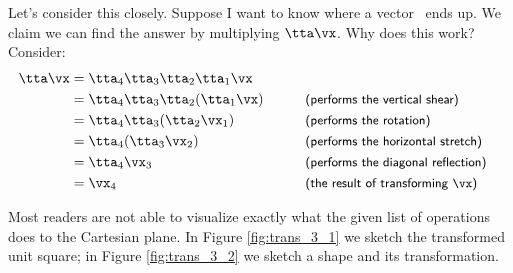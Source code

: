 {Let's consider this closely. Suppose I want to know where a vector \vx\ ends up. We claim we can find the answer by multiplying $\tta\vx$. Why does this work? Consider:
\enlargethispage{2\baselineskip}
\begin{align*}
\tta\vx &= \tta_4\tta_3\tta_2\tta_1\vx \\
				&= \tta_4\tta_3\tta_2(\tta_1\vx) & &\textsf{\hskip 20pt  \small(performs the vertical shear)}\hfill \\
				&= \tta_4\tta_3(\tta_2\vx_1) & &\textsf{\hskip 20pt  \small(performs the rotation)}\hfill\\
				&= \tta_4(\tta_3\vx_2) & &\textsf{\hskip 20pt  \small(performs the horizontal stretch)}\hfill\\
				&= \tta_4\vx_3 & &\textsf{\hskip 20pt  \small(performs the diagonal reflection)}\hfill\\
				&= \vx_4 & &\textsf{\hskip 20pt  \small(the result of transforming $\vx$)}\hfill \\
\end{align*}

Most readers are not able to visualize exactly what the given list of operations does to the Cartesian plane. In Figure \ref{fig:trans_3_1} we sketch the transformed unit square; in Figure \ref{fig:trans_3_2} we sketch a shape and its transformation.

\begin{myfigure}
\begin{center}
\end{center}
\label{fig:trans_3_1}
\end{myfigure}

\begin{myfigure}
\begin{center}
\end{center}
\label{fig:trans_3_2}
\end{myfigure}
\baselineskip}

